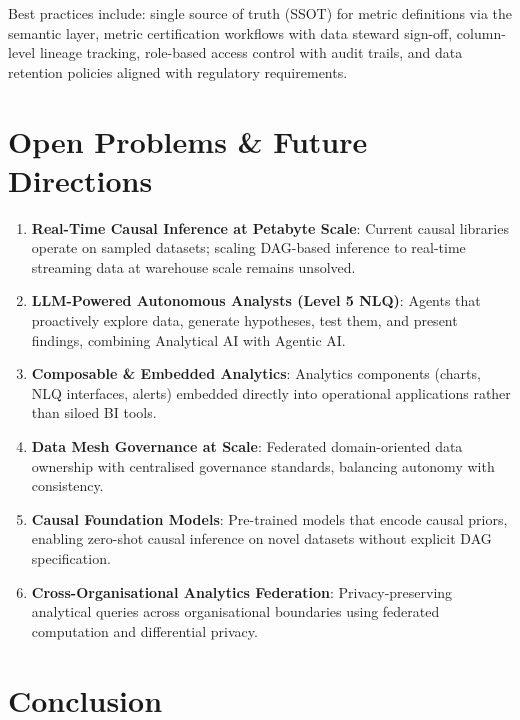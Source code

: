 \documentclass[12pt, a4paper]{article}
\begin{document}
Best practices include: single source of truth (SSOT) for metric definitions via the semantic layer, metric certification workflows with data steward sign-off, column-level lineage tracking, role-based access control with audit trails, and data retention policies aligned with regulatory requirements.

\section{Open Problems \& Future Directions}\label{sec:future}

\begin{enumerate}
    \item \textbf{Real-Time Causal Inference at Petabyte Scale}: Current causal libraries operate on sampled datasets; scaling DAG-based inference to real-time streaming data at warehouse scale remains unsolved.
    \item \textbf{LLM-Powered Autonomous Analysts (Level 5 NLQ)}: Agents that proactively explore data, generate hypotheses, test them, and present findings, combining Analytical AI with Agentic AI.
    \item \textbf{Composable \& Embedded Analytics}: Analytics components (charts, NLQ interfaces, alerts) embedded directly into operational applications rather than siloed BI tools.
    \item \textbf{Data Mesh Governance at Scale}: Federated domain-oriented data ownership with centralised governance standards, balancing autonomy with consistency.
    \item \textbf{Causal Foundation Models}: Pre-trained models that encode causal priors, enabling zero-shot causal inference on novel datasets without explicit DAG specification.
    \item \textbf{Cross-Organisational Analytics Federation}: Privacy-preserving analytical queries across organisational boundaries using federated computation and differential privacy.
\end{enumerate}

\section{Conclusion}\label{sec:conclusion}
\end{document}

